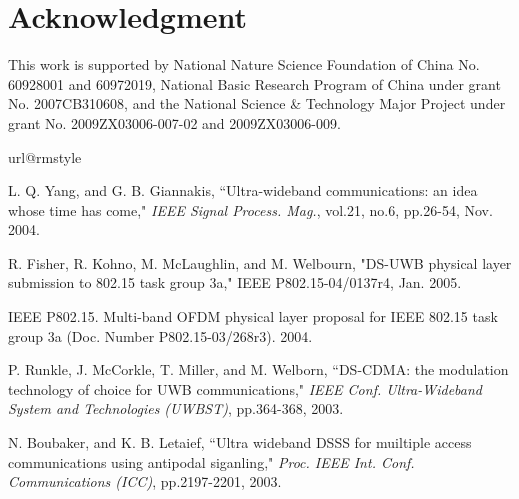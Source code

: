\documentclass[journal]{IEEEtran}
\begin{document}
\section*{Acknowledgment}
This work is supported by National Nature Science Foundation of
China No. 60928001 and 60972019, National Basic Research Program of
China under grant No. 2007CB310608, and the National Science \&
Technology Major Project under grant No. 2009ZX03006-007-02 and
2009ZX03006-009.





\begin{thebibliography}{10}
\providecommand{\url}[1]{#1} \csname url@rmstyle\endcsname
\providecommand{\newblock}{\relax} \providecommand{\bibinfo}[2]{#2}
\providecommand\BIBentrySTDinterwordspacing{\spaceskip=0pt\relax}
\providecommand\BIBentryALTinterwordstretchfactor{4}
\providecommand\BIBentryALTinterwordspacing{\spaceskip=\fontdimen2\font
plus \BIBentryALTinterwordstretchfactor\fontdimen3\font minus
  \fontdimen4\font\relax}
\providecommand\BIBforeignlanguage[2]{{\expandafter\ifx\csname l@#1\endcsname\relax
\typeout{** WARNING: IEEEtran.bst: No hyphenation pattern has been}\typeout{** loaded for the language `#1'. Using the pattern for}\typeout{** the default language instead.}\else \language=\csname l@#1\endcsname \fi #2}}



L. Q. Yang, and G. B. Giannakis, ``Ultra-wideband communications: an
idea whose time has come," {\it IEEE Signal Process. Mag.}, vol.21,
no.6, pp.26-54, Nov. 2004.

R. Fisher, R. Kohno, M. McLaughlin, and M. Welbourn, "DS-UWB
physical layer submission to 802.15 task group 3a," IEEE
P802.15-04/0137r4, Jan. 2005.

IEEE P802.15. Multi-band OFDM physical layer proposal for IEEE
802.15 task group 3a (Doc. Number P802.15-03/268r3). 2004.

P. Runkle, J. McCorkle, T. Miller, and M. Welborn, ``DS-CDMA: the
modulation technology of choice for UWB communications," {\it IEEE
Conf. Ultra-Wideband System and Technologies (UWBST)}, pp.364-368,
2003.

N. Boubaker, and K. B. Letaief, ``Ultra wideband DSSS for muiltiple
access communications using antipodal siganling," {\it Proc. IEEE
Int. Conf. Communications (ICC)}, pp.2197-2201, 2003.


\end{thebibliography}
\end{document}
